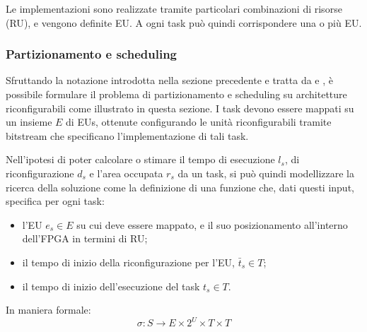 Le implementazioni sono realizzate tramite particolari combinazioni di risorse (\ac{RU}),
e vengono definite \ac{EU}. A ogni task può quindi corrispondere una o più \ac{EU}.

\subsubsection{Partizionamento e scheduling}
Sfruttando la notazione introdotta nella sezione precedente e tratta da \cite{ModelloRedaelli}
e \cite{ReconfigurableSystemDesignVerification}, è possibile formulare il problema
di partizionamento e scheduling su architetture riconfigurabili come illustrato in questa
sezione. I task devono essere mappati su un insieme $E$ di \acp{EU}, 
ottenute configurando le unità riconfigurabili tramite bitstream che specificano 
l'implementazione di tali task.

Nell'ipotesi di poter calcolare o stimare il tempo di esecuzione $l_{s}$, di 
riconfigurazione $d_{s}$ e l'area occupata $r_{s}$ da un task, si può quindi modellizzare 
la ricerca della soluzione come la definizione di una funzione 
che, dati questi input, specifica per ogni task:
\begin{itemize}
 \item l'\ac{EU} $e_s \in E$ su cui deve essere mappato, e il suo posizionamento 
all'interno dell'\ac{FPGA} in termini di \ac{RU};
 \item il tempo di inizio della riconfigurazione per l'\ac{EU}, $\bar{t}_s \in T$;
 \item il tempo di inizio dell'esecuzione del task $t_s \in T$.
\end{itemize}

In maniera formale:
\begin{equation}
\label{formula:mappingScheduling}
 \sigma : S \rightarrow E \times 2^{U} \times T \times T
\end{equation}

